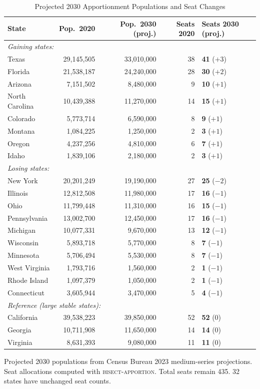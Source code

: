 \begin{table}[ht]
\centering
\caption{Projected 2030 Apportionment Populations and Seat Changes}
\label{tab:projections}
\begin{tabular}{lrrrl}
\toprule
State & Pop.\ 2020 & Pop.\ 2030 (proj.) & Seats 2020 & Seats 2030 (proj.) \\
\midrule
\multicolumn{5}{l}{\textit{Gaining states:}} \\
Texas & 29,145,505 & 33,010,000 & 38 & \textbf{41} ($+3$) \\
Florida & 21,538,187 & 24,240,000 & 28 & \textbf{30} ($+2$) \\
Arizona & 7,151,502 & 8,480,000 & 9 & \textbf{10} ($+1$) \\
North Carolina & 10,439,388 & 11,270,000 & 14 & \textbf{15} ($+1$) \\
Colorado & 5,773,714 & 6,590,000 & 8 & \textbf{9} ($+1$) \\
Montana & 1,084,225 & 1,250,000 & 2 & \textbf{3} ($+1$) \\
Oregon & 4,237,256 & 4,810,000 & 6 & \textbf{7} ($+1$) \\
Idaho & 1,839,106 & 2,180,000 & 2 & \textbf{3} ($+1$) \\
\midrule
\multicolumn{5}{l}{\textit{Losing states:}} \\
New York & 20,201,249 & 19,190,000 & 27 & \textbf{25} ($-2$) \\
Illinois & 12,812,508 & 11,980,000 & 17 & \textbf{16} ($-1$) \\
Ohio & 11,799,448 & 11,310,000 & 16 & \textbf{15} ($-1$) \\
Pennsylvania & 13,002,700 & 12,450,000 & 17 & \textbf{16} ($-1$) \\
Michigan & 10,077,331 & 9,670,000 & 13 & \textbf{12} ($-1$) \\
Wisconsin & 5,893,718 & 5,770,000 & 8 & \textbf{7} ($-1$) \\
Minnesota & 5,706,494 & 5,530,000 & 8 & \textbf{7} ($-1$) \\
West Virginia & 1,793,716 & 1,560,000 & 2 & \textbf{1} ($-1$) \\
Rhode Island & 1,097,379 & 1,050,000 & 2 & \textbf{1} ($-1$) \\
Connecticut & 3,605,944 & 3,470,000 & 5 & \textbf{4} ($-1$) \\
\midrule
\multicolumn{5}{l}{\textit{Reference (large stable states):}} \\
California & 39,538,223 & 39,850,000 & 52 & \textbf{52} (0) \\
Georgia & 10,711,908 & 11,650,000 & 14 & \textbf{14} (0) \\
Virginia & 8,631,393 & 9,080,000 & 11 & \textbf{11} (0) \\
\bottomrule
\end{tabular}
\begin{tablenotes}
\small
\item Projected 2030 populations from Census Bureau 2023 medium-series projections.
  Seat allocations computed with \textsc{bisect-apportion}.
  Total seats remain 435. 32 states have unchanged seat counts.
\end{tablenotes}
\end{table}

